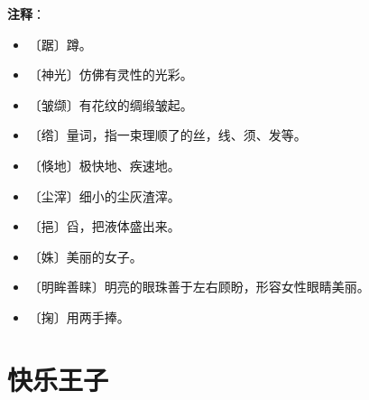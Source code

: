 \documentclass[12pt,UTF-8,openany]{ctexbook}
\begin{document}
\newpage

\textbf{注释}：

\vspace{-1em}

\begin{itemize}
    \setlength\itemsep{-0.2em}
    \item 〔踞〕蹲。
    \item 〔神光〕仿佛有灵性的光彩。
    \item 〔皱缬〕有花纹的绸缎皱起。
    \item 〔绺〕量词，指一束理顺了的丝，线、须、发等。
    \item 〔倏地〕极快地、疾速地。
    \item 〔尘滓〕细小的尘灰渣滓。
    \item 〔挹〕舀，把液体盛出来。
    \item 〔姝〕美丽的女子。
    \item 〔明眸善睐〕明亮的眼珠善于左右顾盼，形容女性眼睛美丽。
    \item 〔掬〕用两手捧。
\end{itemize}

\chapter{快乐王子}
\end{document}
